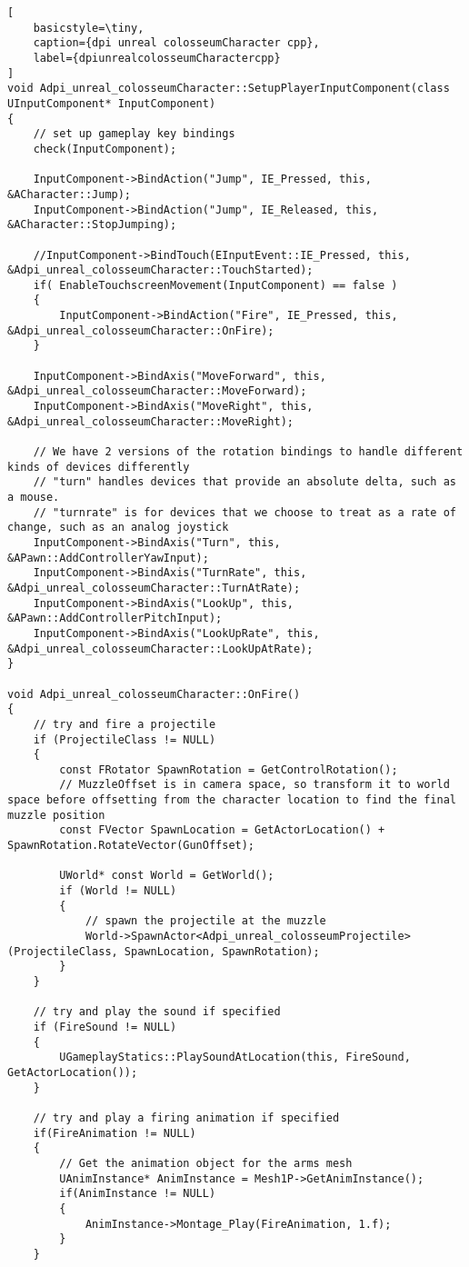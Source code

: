 \begin{lstlisting}[
	basicstyle=\tiny, 
	caption={dpi unreal colosseumCharacter cpp}, 
	label={dpiunrealcolosseumCharactercpp}
]
void Adpi_unreal_colosseumCharacter::SetupPlayerInputComponent(class UInputComponent* InputComponent)
{
	// set up gameplay key bindings
	check(InputComponent);

	InputComponent->BindAction("Jump", IE_Pressed, this, &ACharacter::Jump);
	InputComponent->BindAction("Jump", IE_Released, this, &ACharacter::StopJumping);
	
	//InputComponent->BindTouch(EInputEvent::IE_Pressed, this, &Adpi_unreal_colosseumCharacter::TouchStarted);
	if( EnableTouchscreenMovement(InputComponent) == false )
	{
		InputComponent->BindAction("Fire", IE_Pressed, this, &Adpi_unreal_colosseumCharacter::OnFire);
	}
	
	InputComponent->BindAxis("MoveForward", this, &Adpi_unreal_colosseumCharacter::MoveForward);
	InputComponent->BindAxis("MoveRight", this, &Adpi_unreal_colosseumCharacter::MoveRight);
	
	// We have 2 versions of the rotation bindings to handle different kinds of devices differently
	// "turn" handles devices that provide an absolute delta, such as a mouse.
	// "turnrate" is for devices that we choose to treat as a rate of change, such as an analog joystick
	InputComponent->BindAxis("Turn", this, &APawn::AddControllerYawInput);
	InputComponent->BindAxis("TurnRate", this, &Adpi_unreal_colosseumCharacter::TurnAtRate);
	InputComponent->BindAxis("LookUp", this, &APawn::AddControllerPitchInput);
	InputComponent->BindAxis("LookUpRate", this, &Adpi_unreal_colosseumCharacter::LookUpAtRate);
}

void Adpi_unreal_colosseumCharacter::OnFire()
{ 
	// try and fire a projectile
	if (ProjectileClass != NULL)
	{
		const FRotator SpawnRotation = GetControlRotation();
		// MuzzleOffset is in camera space, so transform it to world space before offsetting from the character location to find the final muzzle position
		const FVector SpawnLocation = GetActorLocation() + SpawnRotation.RotateVector(GunOffset);

		UWorld* const World = GetWorld();
		if (World != NULL)
		{
			// spawn the projectile at the muzzle
			World->SpawnActor<Adpi_unreal_colosseumProjectile>(ProjectileClass, SpawnLocation, SpawnRotation);
		}
	}

	// try and play the sound if specified
	if (FireSound != NULL)
	{
		UGameplayStatics::PlaySoundAtLocation(this, FireSound, GetActorLocation());
	}

	// try and play a firing animation if specified
	if(FireAnimation != NULL)
	{
		// Get the animation object for the arms mesh
		UAnimInstance* AnimInstance = Mesh1P->GetAnimInstance();
		if(AnimInstance != NULL)
		{
			AnimInstance->Montage_Play(FireAnimation, 1.f);
		}
	}


\end{lstlisting}
